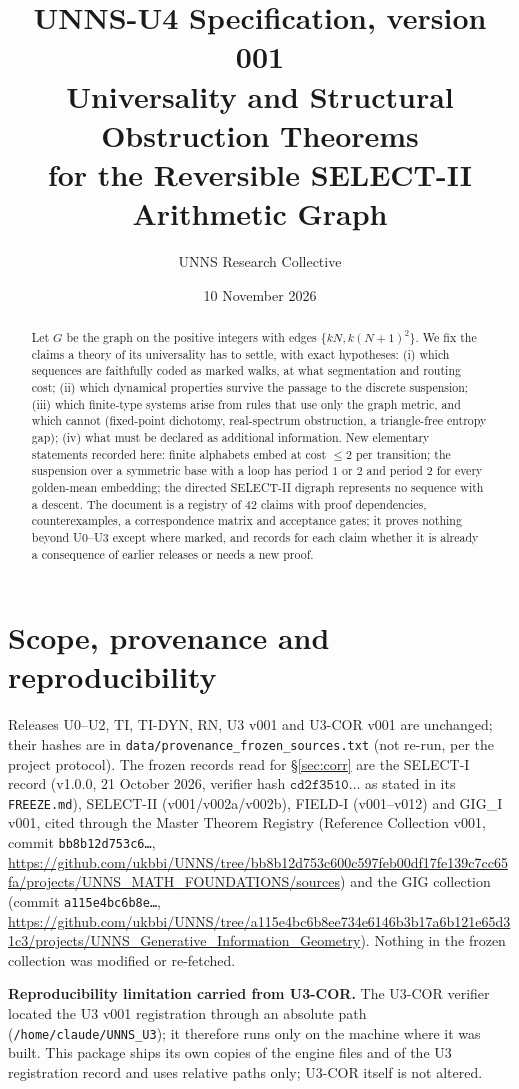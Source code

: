 \documentclass[11pt]{article}
\title{UNNS-U4 Specification, version 001\\Universality and Structural Obstruction Theorems\\for the Reversible SELECT-II Arithmetic Graph}
\author{UNNS Research Collective}\date{10 November 2026}
\begin{document}
\maketitle
\begin{abstract}
Let $G$ be the graph on the positive integers with edges $\{kN,k(N+1)^2\}$. We fix the claims a theory of its universality has to settle, with exact hypotheses: (i) which sequences are faithfully coded as marked walks, at what segmentation and routing cost; (ii) which dynamical properties survive the passage to the discrete suspension; (iii) which finite-type systems arise from rules that use only the graph metric, and which cannot (fixed-point dichotomy, real-spectrum obstruction, a triangle-free entropy gap); (iv) what must be declared as additional information. New elementary statements recorded here: finite alphabets embed at cost $\le2$ per transition; the suspension over a symmetric base with a loop has period $1$ or $2$ and period $2$ for every golden-mean embedding; the directed SELECT-II digraph represents no sequence with a descent. The document is a registry of 42 claims with proof dependencies, counterexamples, a correspondence matrix and acceptance gates; it proves nothing beyond U0--U3 except where marked, and records for each claim whether it is already a consequence of earlier releases or needs a new proof.
\end{abstract}
\section{Scope, provenance and reproducibility}
Releases U0--U2, TI, TI-DYN, RN, U3 v001 and U3-COR v001 are unchanged; their hashes are in \texttt{data/provenance\_frozen\_sources.txt} (not re-run, per the project protocol). The frozen records read for \S\ref{sec:corr} are the SELECT-I record (v1.0.0, 21 October 2026, verifier hash $\texttt{cd2f3510}\ldots$ as stated in its \texttt{FREEZE.md}), SELECT-II (v001/v002a/v002b), FIELD-I (v001--v012) and GIG\_I v001, cited through the Master Theorem Registry (Reference Collection v001, commit \texttt{bb8b12d753c6\ldots}, \url{https://github.com/ukbbi/UNNS/tree/bb8b12d753c600c597feb00df17fe139c7cc65fa/projects/UNNS_MATH_FOUNDATIONS/sources}) and the GIG collection (commit \texttt{a115e4bc6b8e\ldots}, \url{https://github.com/ukbbi/UNNS/tree/a115e4bc6b8ee734e6146b3b17a6b121e65d31c3/projects/UNNS_Generative_Information_Geometry}). Nothing in the frozen collection was modified or re-fetched.

\textbf{Reproducibility limitation carried from U3-COR.} The U3-COR verifier located the U3 v001 registration through an absolute path (\texttt{/home/claude/UNNS\_U3}); it therefore runs only on the machine where it was built. This package ships its own copies of the engine files and of the U3 registration record and uses relative paths only; U3-COR itself is not altered.
\end{document}
